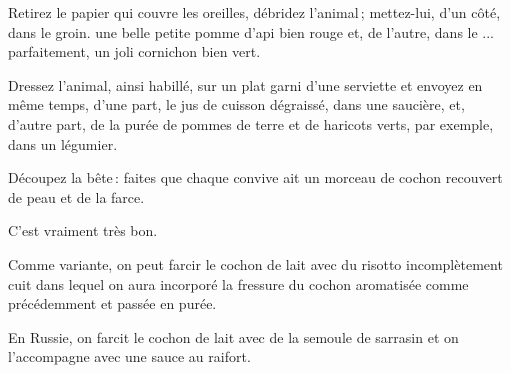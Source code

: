 Retirez le papier qui couvre les oreilles, débridez l'animal ; mettez-lui, d'un
côté, dans le groin. une belle petite pomme d’api bien rouge et, de l'autre, dans
le ... parfaitement, un joli cornichon bien vert.

Dressez l'animal, ainsi habillé, sur un plat garni d'une serviette et envoyez
en même temps, d'une part, le jus de cuisson dégraissé, dans une saucière, et,
d'autre part, de la purée de pommes de terre et de haricots verts, par exemple,
dans un légumier.

Découpez la bête : faites que chaque convive ait un morceau de cochon recouvert
de peau et de la farce.

C'est vraiment très bon.

\sk

Comme variante, on peut farcir le cochon de lait avec du risotto incomplètement
cuit dans lequel on aura incorporé la fressure du cochon aromatisée comme
précédemment et passée en purée.

\sk

En Russie, on farcit le cochon de lait avec de la semoule de sarrasin et on
l'accompagne avec une sauce au raifort.
